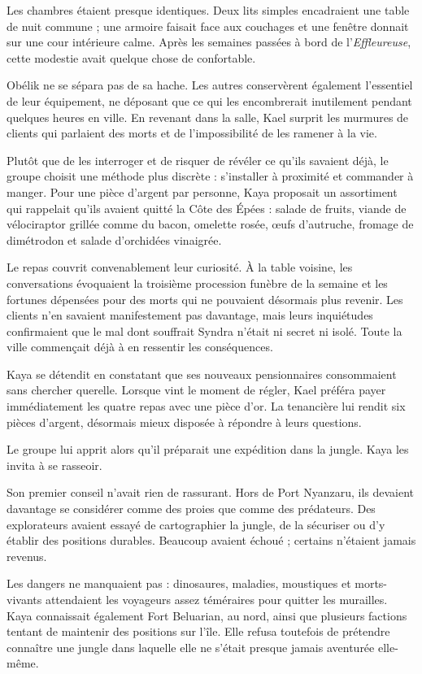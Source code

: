 Les chambres étaient presque identiques. Deux lits simples encadraient une table de nuit commune ; une armoire faisait face aux couchages et une fenêtre donnait sur une cour intérieure calme. Après les semaines passées à bord de l'\textit{Effleureuse}, cette modestie avait quelque chose de confortable.

Obélik ne se sépara pas de sa hache. Les autres conservèrent également l'essentiel de leur équipement, ne déposant que ce qui les encombrerait inutilement pendant quelques heures en ville. En revenant dans la salle, Kael surprit les murmures de clients qui parlaient des morts et de l'impossibilité de les ramener à la vie.

Plutôt que de les interroger et de risquer de révéler ce qu'ils savaient déjà, le groupe choisit une méthode plus discrète : s'installer à proximité et commander à manger. Pour une pièce d'argent par personne, Kaya proposait un assortiment qui rappelait qu'ils avaient quitté la Côte des Épées : salade de fruits, viande de vélociraptor grillée comme du bacon, omelette rosée, œufs d'autruche, fromage de dimétrodon et salade d'orchidées vinaigrée.

Le repas couvrit convenablement leur curiosité. À la table voisine, les conversations évoquaient la troisième procession funèbre de la semaine et les fortunes dépensées pour des morts qui ne pouvaient désormais plus revenir. Les clients n'en savaient manifestement pas davantage, mais leurs inquiétudes confirmaient que le mal dont souffrait Syndra n'était ni secret ni isolé. Toute la ville commençait déjà à en ressentir les conséquences.

Kaya se détendit en constatant que ses nouveaux pensionnaires consommaient sans chercher querelle. Lorsque vint le moment de régler, Kael préféra payer immédiatement les quatre repas avec une pièce d'or. La tenancière lui rendit six pièces d'argent, désormais mieux disposée à répondre à leurs questions.

Le groupe lui apprit alors qu'il préparait une expédition dans la jungle. Kaya les invita à se rasseoir.

\scenebreak

Son premier conseil n'avait rien de rassurant. Hors de Port Nyanzaru, ils devaient davantage se considérer comme des proies que comme des prédateurs. Des explorateurs avaient essayé de cartographier la jungle, de la sécuriser ou d'y établir des positions durables. Beaucoup avaient échoué ; certains n'étaient jamais revenus.

Les dangers ne manquaient pas : dinosaures, maladies, moustiques et morts-vivants attendaient les voyageurs assez téméraires pour quitter les murailles. Kaya connaissait également Fort Beluarian, au nord, ainsi que plusieurs factions tentant de maintenir des positions sur l'île. Elle refusa toutefois de prétendre connaître une jungle dans laquelle elle ne s'était presque jamais aventurée elle-même.

